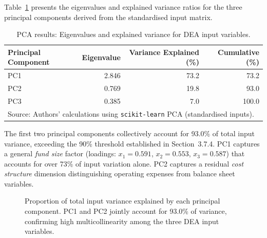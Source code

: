 \documentclass[12pt,a4paper]{article}
\begin{document}
Table~\ref{tab:pca_variance} presents the eigenvalues and explained variance ratios for the three principal components derived from the standardised input matrix.

\begin{table}[H]
\centering
\caption{PCA results: Eigenvalues and explained variance for DEA input variables.}
\label{tab:pca_variance}
\begin{tabular}{lrrr}
\toprule
\textbf{Principal Component} & \textbf{Eigenvalue} & \textbf{Variance Explained (\%)} & \textbf{Cumulative (\%)} \\
\midrule
PC1 & 2.846 & 73.2 &  73.2 \\
PC2 & 0.769 & 19.8 &  93.0 \\
PC3 & 0.385 &  7.0 & 100.0 \\
\bottomrule
\multicolumn{4}{l}{\footnotesize Source: Authors' calculations using \texttt{scikit-learn} PCA (standardised inputs).}
\end{tabular}
\end{table}

The first two principal components collectively account for 93.0\% of total input variance, exceeding the 90\% threshold established in Section~3.7.4. PC1 captures a general \textit{fund size} factor (loadings: $x_1 = 0.591$, $x_2 = 0.553$, $x_3 = 0.587$) that accounts for over 73\% of input variation alone. PC2 captures a residual \textit{cost structure} dimension distinguishing operating expenses from balance sheet variables.

\begin{figure}[H]
\centering
{}
\caption{Proportion of total input variance explained by each principal component. PC1 and PC2 jointly account for 93.0\% of variance, confirming high multicollinearity among the three DEA input variables.}
\label{fig:pca_scree}
\end{figure}
\end{document}
